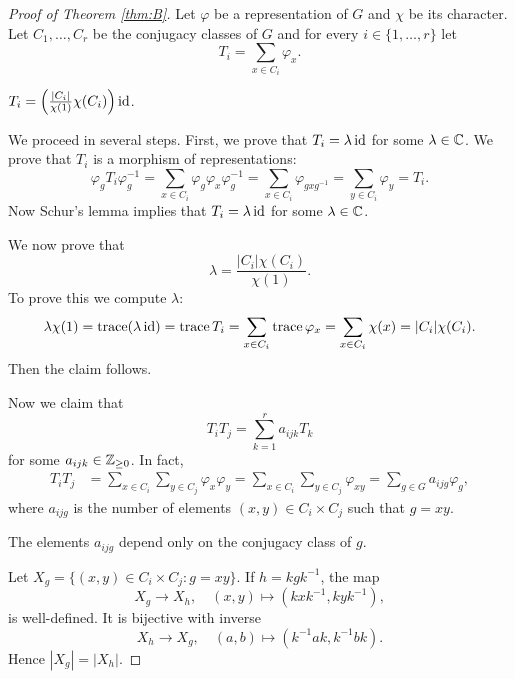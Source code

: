 \begin{proof}[Proof of Theorem \ref{thm:B}]
    Let $\varphi$ be a representation of $G$ and 
    $\chi$ be its character. 
    Let $C_1,\dots,C_r$ be the conjugacy classes of $G$ 
    and for every $i\in\{1,\dots,r\}$ let 
    \[
    T_i=\sum_{x\in C_i}\varphi_x. 
    \]
    
    \begin{claim}
        $T_i=\left(\frac{|C_i|}{\chi(1)}\chi(C_i)\right)\operatorname{id}$. 
    \end{claim}
    
    We proceed in several steps. First, we prove that 
    $T_i=\lambda\operatorname{id}$ for some $\lambda\in\mathbb{C}$. 
    We prove that $T_i$ is a morphism of representations:
    \[
    \varphi_gT_i\varphi_g^{-1}=\sum_{x\in C_i}\varphi_g\varphi_x\varphi_g^{-1}
    =\sum_{x\in C_i}\varphi_{gxg^{-1}}=\sum_{y\in C_i}\varphi_y=T_i.
    \]
    Now Schur's lemma implies that $T_i=\lambda\operatorname{id}$ for some
    $\lambda\in\mathbb{C}$. 
    
    We now prove that 
    \[
    \lambda=\frac{|C_i|\chi(C_i)}{\chi(1)}.
    \]
    To prove
    this we compute $\lambda$:
    \[
    \lambda\chi(1)=\operatorname{trace}(\lambda\operatorname{id})
    =\operatorname{trace} T_i
    =\sum_{x\in C_i}\operatorname{trace}\varphi_x
    =\sum_{x\in C_i}\chi(x)
    =|C_i|\chi(C_i).
    \]
    Then the claim follows. 
    
    Now we claim that 
    \[
    T_iT_j=\sum_{k=1}^r a_{ijk}T_k
    \]
    for some $a_{ijk}\in\mathbb{Z}_{\geq0}$. In fact, 
    \begin{align*}
        T_iT_j &= \sum_{x\in C_i}\sum_{y\in C_j}\varphi_x\varphi_y
        =\sum_{x\in C_i}\sum_{y\in C_j}\varphi_{xy}
        =\sum_{g\in G}a_{ijg}\varphi_g,
    \end{align*}
    where $a_{ijg}$ is the number of elements $(x,y)\in C_i\times C_j$ 
    such that $g=xy$. 
    
    \begin{claim}
        The elements $a_{ijg}$ depend only on the conjugacy class of $g$. 
    \end{claim}
    
    Let $X_g=\{(x,y)\in C_i\times C_j:g=xy\}$. If $h=kgk^{-1}$, the map
    \[
    X_g\to X_h,\quad (x,y)\mapsto (kxk^{-1},kyk^{-1}),
    \]
    is well-defined. It is bijective with inverse
    \[
    X_h\to X_g,\quad
    (a,b)\mapsto (k^{-1}ak,k^{-1}bk).
    \]
    Hence $|X_g|=|X_h|$. 


\end{proof}
